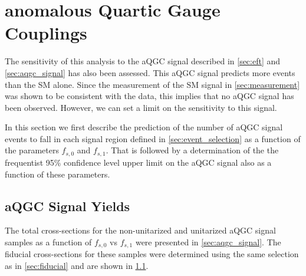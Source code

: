 \section{anomalous Quartic Gauge Couplings}
\label{sec:aqgc_limit}

The sensitivity of this analysis to the aQGC signal described in \sec\ref{sec:eft} and 
\sec\ref{sec:aqgc_signal} has also been assessed.  This aQGC signal predicts
more events than the SM alone. Since the measurement of the SM signal in
\sec\ref{sec:measurement} was shown to be consistent with the data, this implies
that no aQGC signal has been observed. However, we can set a limit on the sensitivity 
to this signal.

In this section we first describe the prediction of the number of aQGC signal events
to fall in each signal region defined in \sec\ref{sec:event_selection} as a function
of the parameters $f_{s,0}$ and $f_{s,1}$. That is followed by 
a determination of the the frequentist 95\% confidence level upper limit on the aQGC
signal also as a function of these parameters. 

\subsection{aQGC Signal Yields}
The total cross-sections for the non-unitarized and unitarized aQGC
signal samples as a function of $f_{s,0}$ vs $f_{s,1}$ 
were presented in \sec\ref{sec:aqgc_signal}.
The fiducial cross-sections for these samples were determined using 
the same selection as in \sec\ref{sec:fiducial} and are shown in 
\fig\ref{}.

